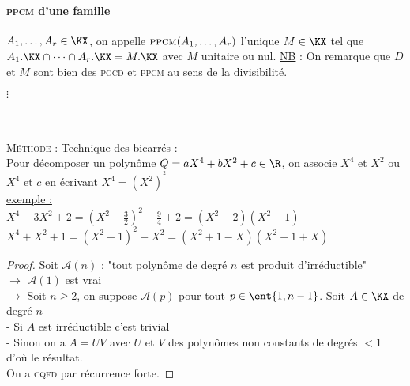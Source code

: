 		\paragraph{\textsc{ppcm} d'une famille}
			$A_1,\dots ,A_r \in\KX$, on appelle $\textsc{ppcm}(A_1,\dots , A_r)$ l'unique $M\in\KX$ tel que $A_1.\KX \cap \cdots \cap A_r.\KX = M.\KX $ avec $M$ unitaire ou nul. \trait
		\uline{NB} : On remarque que $D$ et $M$ sont bien des \textsc{pgcd} et \textsc{ppcm} au sens de la divisibilité. 
		\vspace*{0.5cm} \\ 
		\begin{center}
		$\vdots$
		\end{center}
		${}$ \\ 
		\vspace*{0.5cm} \\  \vspace*{0.5cm}\\
		\textsc{Méthode} : Technique des bicarrés : \\
		Pour décomposer un polynôme $Q=aX^4+bX^2+c \in\R$, on associe $X^4$ et $X^2$ ou $X^4$ et $c$ en écrivant $X^4=(X^2)^{^{2}}$\\
		\uline{exemple :}\\
		$X^4-3X^2 + 2 = \left( X^2 - \frac{3}{2}\right) ^2 - \frac{9}{4} +2 = (X^2-2)(X^2-1)$\\
		$X^4+X^2+1 = (X^2 + 1)^2 - X^2 = (X^2+1-X)(X^2+1+X)$
		\vspace*{0.5cm} \\ 
		\begin{proof}
		Soit $\mathcal{A}(n)$ : "tout polynôme de degré $n$ est produit d'irréductible"\\
		$\rightarrow$ $\mathcal{A}(1)$ est vrai\\
		$\rightarrow$ Soit $n\geq 2$, on suppose $\mathcal{A}(p)$ pour tout $p\in\ent{1,n-1}$. Soit $A\in\KX$ de degré $n$\\
		\hspace*{0.5cm} - Si $A$ est irréductible c'est trivial\\
		\hspace*{0.5cm} - Sinon on a $A=UV$ avec $U$ et $V$ des polynômes non constants de degrés $<1$ d'où le résultat.\\
		On a \textsc{cqfd} par récurrence forte.
		\end{proof}
